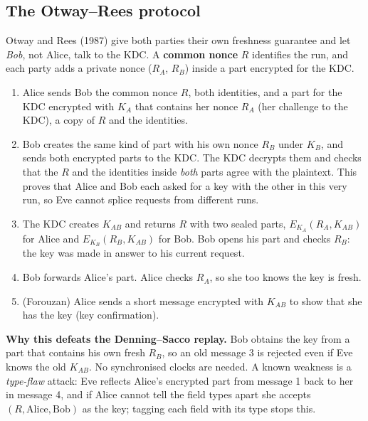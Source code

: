 \subsection{The Otway--Rees protocol \new}

Otway and Rees (1987) give both parties their own freshness guarantee and let \emph{Bob}, not Alice, talk to the KDC. A \textbf{common nonce} $R$ identifies the run, and each party adds a private nonce ($R_A$, $R_B$) inside a part encrypted for the KDC.
\begin{center}
\end{center}
\begin{enumerate}
  \item Alice sends Bob the common nonce $R$, both identities, and a part for the KDC encrypted with $K_A$ that contains her nonce $R_A$ (her challenge to the KDC), a copy of $R$ and the identities.
  \item Bob creates the same kind of part with his own nonce $R_B$ under $K_B$, and sends both encrypted parts to the KDC. The KDC decrypts them and checks that the $R$ and the identities inside \emph{both} parts agree with the plaintext. This proves that Alice and Bob each asked for a key with the other in this very run, so Eve cannot splice requests from different runs.
  \item The KDC creates $K_{AB}$ and returns $R$ with two sealed parts, $E_{K_A}(R_A, K_{AB})$ for Alice and $E_{K_B}(R_B, K_{AB})$ for Bob. Bob opens his part and checks $R_B$: the key was made in answer to his current request.
  \item Bob forwards Alice's part. Alice checks $R_A$, so she too knows the key is fresh.
  \item (Forouzan) Alice sends a short message encrypted with $K_{AB}$ to show that she has the key (key confirmation).
\end{enumerate}
\textbf{Why this defeats the Denning--Sacco replay.} Bob obtains the key from a part that contains his own fresh $R_B$, so an old message 3 is rejected even if Eve knows the old $K_{AB}$. No synchronised clocks are needed. A known weakness is a \emph{type-flaw} attack: Eve reflects Alice's encrypted part from message 1 back to her in message 4, and if Alice cannot tell the field types apart she accepts $(R, \text{Alice}, \text{Bob})$ as the key; tagging each field with its type stops this.

